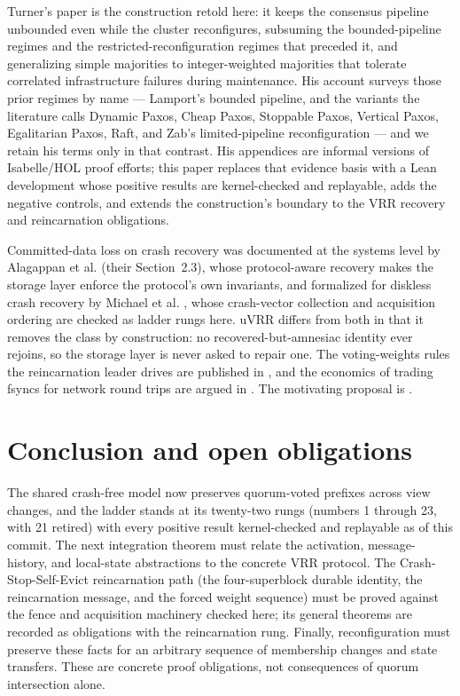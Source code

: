 \documentclass[10pt,journal,letterpaper]{IEEEtran}
\begin{document}
Turner's paper \cite{turner} is the construction retold here: it keeps the
consensus pipeline unbounded even while the cluster reconfigures, subsuming
the bounded-pipeline regimes and the restricted-reconfiguration regimes that
preceded it, and generalizing simple majorities to integer-weighted
majorities that tolerate correlated infrastructure failures during
maintenance. His account surveys those prior regimes by name --- Lamport's
bounded pipeline, and the variants the literature calls Dynamic Paxos, Cheap
Paxos, Stoppable Paxos, Vertical Paxos, Egalitarian Paxos, Raft, and Zab's
limited-pipeline reconfiguration --- and we retain his terms only in that
contrast. His appendices are informal versions of Isabelle/HOL proof efforts;
this paper replaces that evidence basis with a Lean development whose
positive results are kernel-checked and replayable, adds the negative
controls, and extends the construction's boundary to the VRR recovery and
reincarnation obligations.

Committed-data loss on crash recovery was documented at the systems level by
Alagappan et al. \cite{alagappan2018} (their Section~2.3), whose
protocol-aware recovery makes
the storage layer enforce the protocol's own invariants, and formalized for
diskless crash recovery by Michael et al. \cite{diskless,recovery}, whose
crash-vector collection and acquisition ordering are checked as ladder rungs
here. uVRR differs from both in that it removes the class by construction:
no recovered-but-amnesiac identity ever rejoins, so the storage layer is
never asked to repair one. The voting-weights rules the reincarnation leader
drives are published in \cite{votingweights}, and the economics of trading
fsyncs for network round trips are argued in \cite{netdisk}. The motivating
proposal is \cite{uvrr}.

\section{Conclusion and open obligations}\label{sec:conclusion}
The shared crash-free model now preserves quorum-voted prefixes across
view changes, and the ladder stands at its twenty-two rungs (numbers 1
through 23, with 21 retired) with every
positive result kernel-checked and replayable as of this commit. The next
integration theorem must relate the activation,
message-history, and local-state abstractions to the concrete VRR protocol. The Crash-Stop-Self-Evict reincarnation path (the four-superblock durable
identity, the reincarnation message, and the forced weight sequence) must be
proved against the fence and acquisition machinery checked here; its general
theorems are recorded as obligations with the reincarnation rung. Finally,
reconfiguration must preserve these facts for an arbitrary sequence of
membership changes and state transfers. These are concrete proof obligations,
not consequences of quorum intersection alone.
\end{document}
